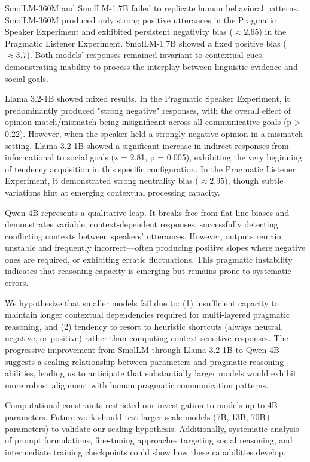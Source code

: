 \documentclass[11pt]{article}
\begin{document}
SmolLM-360M and SmolLM-1.7B failed to replicate human behavioral patterns. SmolLM-360M produced only strong positive utterances in the Pragmatic Speaker Experiment and exhibited persistent negativity bias ($\approx 2.65$) in the Pragmatic Listener Experiment. SmolLM-1.7B showed a fixed positive bias ($\approx 3.7$). Both models' responses remained invariant to contextual cues, demonstrating inability to process the interplay between linguistic evidence and social goals.

Llama 3.2-1B showed mixed results. In the Pragmatic Speaker Experiment, it predominantly produced "strong negative" responses, with the overall effect of opinion match/mismatch being insignificant across all communicative goals (p > 0.22). However, when the speaker held a strongly negative opinion in a mismatch setting, Llama 3.2-1B showed a significant increase in indirect responses from informational to social goals (z = 2.81, p = 0.005), exhibiting the very beginning of tendency acquisition in this specific configuration. In the Pragmatic Listener Experiment, it demonstrated strong neutrality bias ($\approx 2.95$), though subtle variations hint at emerging contextual processing capacity.

Qwen 4B represents a qualitative leap. It breaks free from flat-line biases and demonstrates variable, context-dependent responses, successfully detecting conflicting contexts between speakers' utterances. However, outputs remain unstable and frequently incorrect—often producing positive slopes where negative ones are required, or exhibiting erratic fluctuations. This pragmatic instability indicates that reasoning capacity is emerging but remains prone to systematic errors.

We hypothesize that smaller models fail due to: (1) insufficient capacity to maintain longer contextual dependencies required for multi-layered pragmatic reasoning, and (2) tendency to resort to heuristic shortcuts (always neutral, negative, or positive) rather than computing context-sensitive responses. The progressive improvement from SmolLM through Llama 3.2-1B to Qwen 4B suggests a scaling relationship between parameters and pragmatic reasoning abilities, leading us to anticipate that substantially larger models would exhibit more robust alignment with human pragmatic communication patterns.

Computational constraints restricted our investigation to models up to 4B parameters. Future work should test larger-scale models (7B, 13B, 70B+ parameters) to validate our scaling hypothesis. Additionally, systematic analysis of prompt formulations, fine-tuning approaches targeting social reasoning, and intermediate training checkpoints could show how these capabilities develop.
\end{document}

